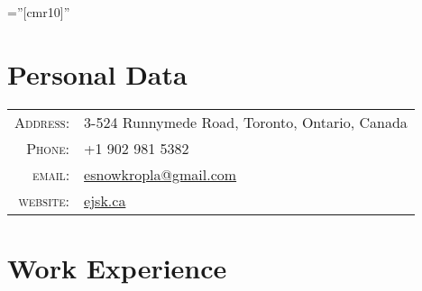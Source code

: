 \documentclass[a4paper,11pt]{article} %
\begin{document}
\pagestyle{empty} %

\font\fb=''[cmr10]'' %


\par{\bigskip\par} %

\section{Personal Data}

\begin{tabular}{rl}
\textsc{Address:} & 3-524 Runnymede Road, Toronto, Ontario, Canada \\
\textsc{Phone:} & +1 902 981 5382\\
\textsc{email:} & \href{mailto:esnowkropla@gmail.com}{esnowkropla@gmail.com}\\
\textsc{website:} & \href{http://www.ejsk.ca}{ejsk.ca}\\
\end{tabular}


\section{Work Experience}
\end{document}
